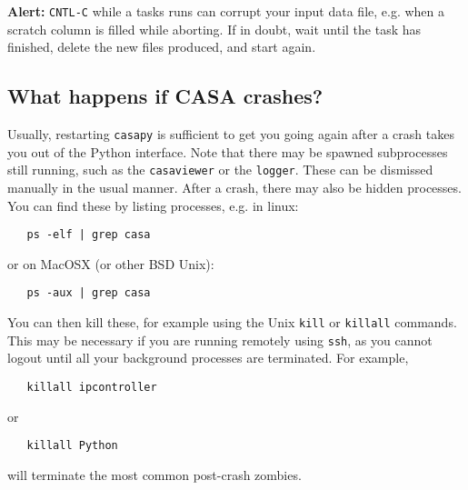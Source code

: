 {\bf Alert:} {\tt CNTL-C} while a tasks runs can corrupt your input
data file, e.g. when a scratch column is filled while aborting. If in
doubt, wait until the task has finished, delete the new files produced,
and start again. 



% 
% 
% 

\subsection{What happens if CASA crashes?}
\label{section:intro.basics.crash}

Usually, restarting {\tt casapy} is sufficient to get you going again
after a crash takes you out of the Python interface.  Note that there
may be spawned subprocesses still running, such as the 
{\tt casaviewer} or the {\tt logger}.  These can be dismissed manually
in the usual manner.  After a crash, there may also be hidden
processes.  You can find these by listing processes, e.g. in linux:
\small
\begin{verbatim}
   ps -elf | grep casa
\end{verbatim}
\normalsize
or on MacOSX (or other BSD Unix):
\small
\begin{verbatim}
   ps -aux | grep casa
\end{verbatim}
\normalsize
You can then kill these, for example using the Unix {\tt kill}
or {\tt killall} commands.  This may be necessary if you are running
remotely using {\tt ssh}, as you cannot logout until all your
background processes are terminated.  For example,
\small
\begin{verbatim}
   killall ipcontroller
\end{verbatim}
\normalsize
or
\small
\begin{verbatim}
   killall Python
\end{verbatim}
\normalsize
will terminate the most common post-crash zombies.

